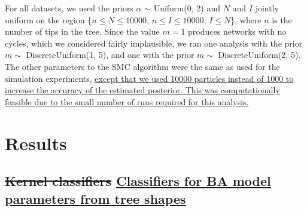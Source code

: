 \documentclass[12pt]{article}\usepackage[]{graphicx}\usepackage[]{color}
\newcommand{\add}[1]{\color{blue} \uline{#1} \color{black}}
\newcommand{\del}[1]{\color{red} \sout{#1} \color{black}}
\begin{document}
For all datasets, we used the priors $\alpha$ $\sim$ Uniform(0, 2) and $N$ and
$I$ jointly uniform on the region \{$n \leq N \leq 10000$, $n \leq I \leq
10000$, $I \leq N$\}, where $n$ is the number of tips in the tree. Since the
value $m = 1$ produces networks with no cycles, which we considered fairly
implausible, we ran one analysis with the prior $m \sim$ DiscreteUniform(1, 5),
and one with the prior $m \sim$ DiscreteUniform(2, 5). The other parameters to
the SMC algorithm were the same as used for the simulation experiments,
\add{except that we used 10000 particles instead of 1000 to increase the
accuracy of the estimated posterior. This was computationally feasible due to
the small number of runs required for this analysis.}

\section*{Results}

\subsection*{\del{Kernel classifiers}\add{Classifiers for BA model parameters from tree shapes}}
\end{document}

